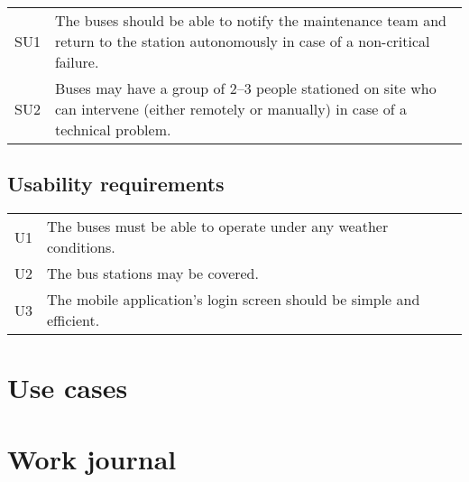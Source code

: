 \documentclass[a4paper]{article}
\begin{document}
\begin{tabular}{l l}
        SU1 & The buses should be able to notify the maintenance team and return to the station autonomously in case of a non-critical failure. \\
        SU2 & Buses may have a group of 2–3 people stationed on site who can intervene (either remotely or manually) in case of a technical problem. \\
\end{tabular}




\subsection{Usability requirements}

\begin{tabular}{l l}
        U1 & The buses must be able to operate under any weather conditions. \\
        U2 & The bus stations may be covered. \\
        U3 & The mobile application’s login screen should be simple and efficient. \\
\end{tabular}

\section{Use cases}




\section{Work journal}


\clearpage
\printglossaries %
\end{document}
